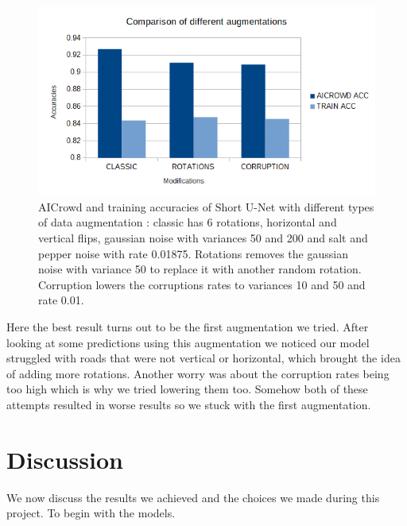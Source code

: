 \documentclass[10pt,conference,compsocconf]{IEEEtran}
\begin{document}
\begin{figure}[H]
    \centering
    \includegraphics[scale = 0.4]{data_graph.png} %
    \caption{AICrowd and training accuracies of Short U-Net with different types of data augmentation : classic has 6 rotations, horizontal and vertical flips, gaussian noise with variances 50 and 200 and salt and pepper noise with rate 0.01875. Rotations removes the gaussian noise with variance 50 to replace it with another random rotation. Corruption lowers the corruptions rates to variances 10 and 50 and rate 0.01.}
\end{figure}
Here the best result turns out to be the first augmentation we tried. After looking at some predictions using this augmentation we noticed our model struggled with roads that were not vertical or horizontal, which brought the idea of adding more rotations. Another worry was about the corruption rates being too high which is why we tried lowering them too. Somehow both of these attempts resulted in worse results so we stuck with the first augmentation.
\section{Discussion}
We now discuss the results we achieved and the choices we made during this project. To begin with the models. 
\end{document}
